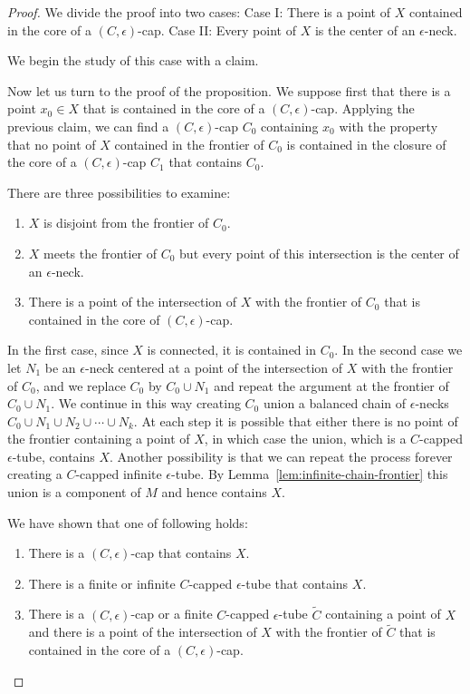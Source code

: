 \begin{proof}
\sketch
{}
We divide the proof into two cases: Case I: There is a point of $X$
contained in the core of a $(C,\epsilon)$-cap. Case II: Every point
of $X$ is the center of an $\epsilon$-neck.

 We begin the study of this case with a claim.

Now let us turn to the proof of the proposition. We suppose first
that there is a point $x_0\in X$ that is contained in the core of a
$(C,\epsilon)$-cap. Applying the previous claim, we can find a
$(C,\epsilon)$-cap $C_0$ containing $x_0$ with the property that no
point of $X$ contained in the  frontier of $C_0$ is contained in the
closure of the core of a $(C,\epsilon)$-cap $C_1$ that contains
$C_0$.

There are three possibilities to examine:
\begin{enumerate}
\item[(i)] $X$ is disjoint from the frontier of $C_0$.
\item[(ii)] $X$ meets the frontier of $C_0$ but every point of this
intersection is the center of an $\epsilon$-neck.
\item[(iii)] There is a point of the intersection of $X$
with the frontier of $C_0$ that is contained in the core of
$(C,\epsilon)$-cap.
\end{enumerate}

In the first case, since $X$ is connected, it is contained in $C_0$.
In the second case we let $N_1$ be an $\epsilon$-neck centered at a
point of the intersection of $X$ with the frontier of $C_0$, and we
replace $C_0$ by $C_0\cup N_1$ and repeat the argument at the
frontier of $C_0\cup N_1$. We continue in this way creating $C_0$
union a balanced chain of $\epsilon$-necks $C_0\cup N_1\cup N_2\cup
\cdots\cup N_k$. At each step it is possible that either there is no
point of the frontier containing a point of $X$, in which case the
union, which is a $C$-capped $\epsilon$-tube, contains $X$. Another
possibility is that we can repeat the process forever creating a
$C$-capped infinite $\epsilon$-tube. By Lemma~\ref{lem:infinite-chain-frontier} this
union is a component of $M$ and hence contains $X$.

We have shown that one of following holds:
\begin{enumerate}
\item[(a)] There is a $(C,\epsilon)$-cap that contains $X$.
\item[(b)] There is a finite or infinite $C$-capped $\epsilon$-tube that
contains $X$.
\item[(c)] There is a $(C,\epsilon)$-cap or a finite $C$-capped
$\epsilon$-tube $\widetilde C$ containing a point of $X$ and there
is a point of the intersection of $X$ with the frontier of
$\widetilde C$ that is contained in the core of a
$(C,\epsilon)$-cap.
\end{enumerate}


\end{proof}

